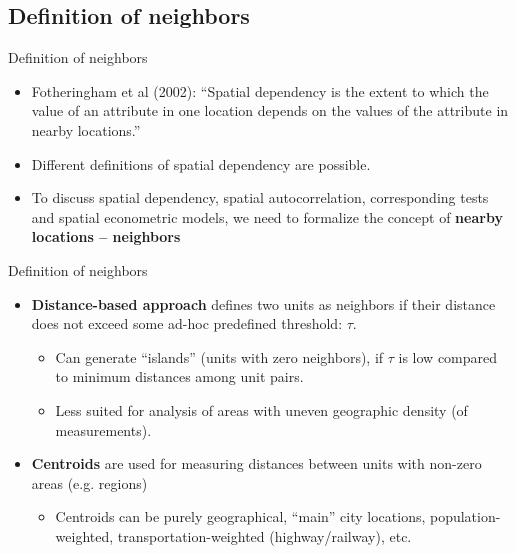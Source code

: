 \documentclass{beamer}
\begin{document}
\subsection{Definition of neighbors}
\begin{frame}{Definition of neighbors}
\begin{itemize}
    \item Fotheringham et al (2002): ``Spatial dependency is the extent to which the value of an attribute in one location depends on the values of the attribute in nearby locations.''
    \medskip
    \item Different definitions of spatial dependency are possible.
    \medskip
    \item To discuss spatial dependency, spatial autocorrelation, corresponding tests and spatial econometric models, we need to formalize the concept of \textbf{nearby locations -- neighbors}
\end{itemize}
\end{frame}
\begin{frame}{Definition of neighbors}
\begin{itemize}
	\item \textbf{Distance-based approach} defines two units as neighbors if their distance does not exceed some ad-hoc predefined threshold: $\tau$. \\
	\medskip
	\begin{itemize}
		\item Can generate ``islands'' (units with zero neighbors), if $\tau$ is low compared to minimum distances among unit pairs.
		\smallskip
		\item Less suited for analysis of areas with uneven geographic density (of measurements). 
	\end{itemize}
	\medskip
	\item \textbf{Centroids} are used for measuring distances between units with non-zero areas (e.g. regions)\\
	\medskip
	\begin{itemize}
		\item Centroids can be purely geographical, ``main'' city locations, population-weighted, transportation-weighted (highway/railway), etc.
	\end{itemize}
\end{itemize}
\end{frame}
\end{document}
